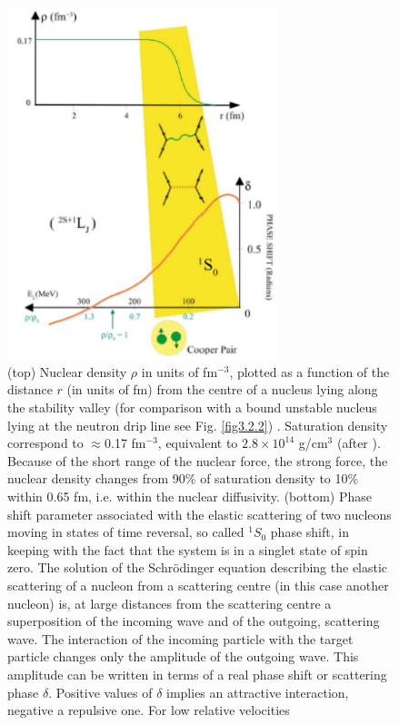   \begin{figure}
  \centerline{\includegraphics*[width=0.7\textwidth,angle=0]{nutshell/figs/fig1F1.pdf}}\caption{(top) Nuclear density $\rho$ in units of fm$^{-3}$, plotted as a function of the distance $r$ (in units of fm) from
    the centre of a nucleus lying along the stability valley (for comparison with a bound unstable nucleus lying at the neutron drip line see Fig. \ref{fig3.2.2}) . Saturation density correspond to $\approx$0.17 fm$^{-3}$, equivalent to $2.8\times 10^{14}$ g/cm$^3$ (after \cite{Bohr:69}). Because of the short range of
    the nuclear force, the strong force, the nuclear density changes from 90\% of saturation density to 10\% within 0.65 fm, i.e. within the
    nuclear diffusivity. (bottom) Phase shift  parameter associated with the elastic scattering of two nucleons moving in states of time reversal, so
    called $^1S_0$ phase shift, in keeping with the fact that the system is in a singlet state of spin zero. The solution of the Schr\"odinger equation
    describing the elastic scattering of a nucleon from a scattering centre (in this case another nucleon) is, at large distances from the
    scattering centre a superposition of the incoming wave and of the outgoing, scattering wave. The interaction of the incoming particle
    with the target particle changes only the amplitude of the outgoing wave. This amplitude can be written in terms of a real phase
    shift  or scattering phase $\delta$. Positive values of $\delta$ implies an attractive interaction, negative a repulsive one. For low relative velocities
}
\end{figure}
